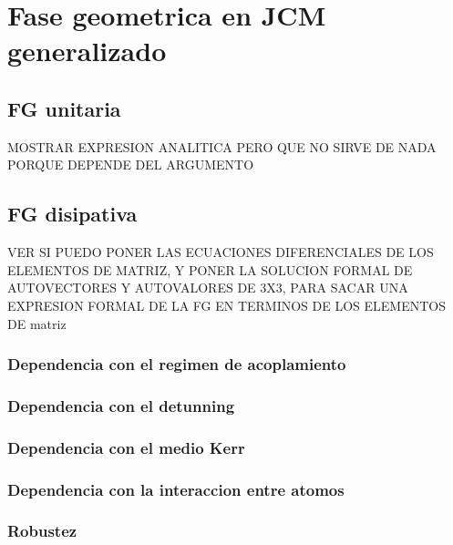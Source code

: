 \chapter{Fase geometrica en JCM generalizado}
\label{ch:fgdoble}

\pagestyle{fancy}
\fancyhf{}
\fancyhead[LE]{\nouppercase{\rightmark\hfill}}
\fancyhead[RO]{\nouppercase{\leftmark\hfill}}
\fancyfoot[LE,RO]{\hfill\thepage\hfill}

\section{FG unitaria}
MOSTRAR EXPRESION ANALITICA PERO QUE NO SIRVE DE NADA PORQUE DEPENDE DEL ARGUMENTO
\section{FG disipativa}
VER SI PUEDO PONER LAS ECUACIONES DIFERENCIALES DE LOS ELEMENTOS DE MATRIZ, Y PONER LA SOLUCION FORMAL DE AUTOVECTORES Y AUTOVALORES DE 3X3, PARA SACAR UNA EXPRESION FORMAL DE LA FG EN TERMINOS DE LOS ELEMENTOS DE matriz
\subsection{Dependencia con el regimen de acoplamiento}
\subsection{Dependencia con el detunning}
\subsection{Dependencia con el medio Kerr}
\subsection{Dependencia con la interaccion entre atomos}
\subsection{Robustez}